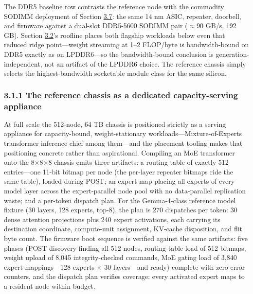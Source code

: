 \documentclass[12pt,onecolumn]{article}
\begin{document}
The DDR5 baseline row contrasts the reference node with the commodity SODIMM deployment of Section \hyperref[sec:3.7]{3.7}: the same 14 nm ASIC, repeater, doorbell, and firmware against a dual-slot DDR5-5600 SODIMM pair ($\approx$90 GB/s, 192 GB). Section \hyperref[sec:3.2]{3.2}'s roofline places both flagship workloads below even that reduced ridge point---weight streaming at 1--2 FLOP/byte is bandwidth-bound on DDR5 exactly as on LPDDR6---so the bandwidth-bound conclusion is generation-independent, not an artifact of the LPDDR6 choice. The reference chassis simply selects the highest-bandwidth socketable module class for the same silicon.

\subsubsection*{3.1.1 The reference chassis as a dedicated capacity-serving appliance}\label{sec:3.1.1}

At full scale the 512-node, 64 TB chassis is positioned strictly as a serving appliance for capacity-bound, weight-stationary workloads---Mixture-of-Experts transformer inference chief among them\cite{27}---and the placement tooling makes that positioning concrete rather than aspirational. Compiling an MoE transformer onto the 8$\times$8$\times$8 chassis emits three artifacts: a routing table of exactly 512 entries---one 11-bit bitmap per node (the per-layer repeater bitmaps ride the same table), loaded during POST; an expert map placing all experts of every model layer across the expert-parallel node pool with no data-parallel replication waste; and a per-token dispatch plan. For the Gemma-4-class reference model fixture (30 layers, 128 experts, top-8), the plan is 270 dispatches per token: 30 dense attention projections plus 240 expert activations, each carrying its destination coordinate, compute-unit assignment, KV-cache disposition, and flit byte count. The firmware boot sequence is verified against the same artifacts: five phases (POST discovery finding all 512 nodes, routing-table load of 512 bitmaps, weight upload of 8,045 integrity-checked commands, MoE gating load of 3,840 expert mappings---128 experts $\times$ 30 layers---and ready) complete with zero error counters, and the dispatch plan verifies coverage: every activated expert maps to a resident node within budget.
\end{document}
